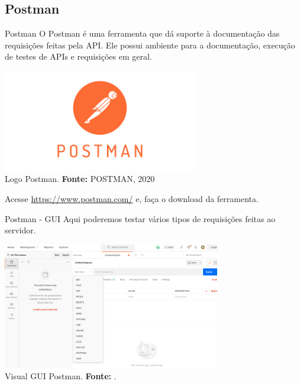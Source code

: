 \documentclass{beamer}
\begin{document}
 \subsection{Postman}
    \begin{frame}{Postman}
 	O Postman é uma ferramenta que dá suporte à documentação das requisições feitas pela API. Ele possui ambiente para a documentação, execução de testes de APIs e requisições em geral.
        
         \begin{center}
    	\includegraphics[width=85mm]{resources/aula4_13.png}\\
        \tiny{ Logo Postman. \textbf{Fonte:} POSTMAN, 2020}
     \end{center}   
      Acesse \href{https://www.postman.com/}{https://www.postman.com/} e, faça o download da ferramenta.
    \end{frame}    
    \begin{frame}{Postman - GUI}
 	Aqui poderemos testar vários tipos de requisições feitas ao servidor.
        
         \begin{center}
    	\includegraphics[width=95mm]{resources/aula4_14.png}\\
        \tiny{ Visual GUI Postman. \textbf{Fonte:} \cite{postman2022}.}
     \end{center}   
    \end{frame}    
\end{document}
